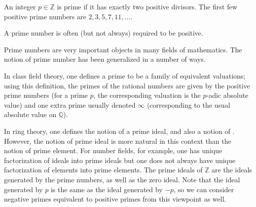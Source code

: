 \documentclass{article}
\begin{document}
An integer $p \in \mathbb{Z}$ is prime if it has exactly two positive divisors. The first few positive prime numbers are $2, 3, 5, 7, 11, \dots$.

A prime number is often (but not always) required to be positive.

Prime numbers are very important objects in many fields of mathematics.  The notion of prime number has been generalized in a number of ways.  

In class field theory, one defines a prime to be a family of equivalent valuations; using this definition, the primes of the rational numbers are given by the positive prime numbers (for a prime $p$, the corresponding valuation is the $p$-adic absolute value) and one extra prime usually denoted $\infty$ (corresponding to the usual absolute value on $\mathbb{Q}$). 

In ring theory, one defines the notion of a prime ideal, and also a notion of .  However, the notion of prime ideal is more natural in this context than the notion of prime element.  For number fields, for example, one has unique factorization of ideals into prime ideals but one does not always have unique factorization of elements into prime elements.  The prime ideals of $\mathbb{Z}$ are the ideals generated by the prime numbers, as well as the zero ideal.  Note that the ideal generated by $p$ is the same as the ideal generated by $-p$, so we can consider negative primes equivalent to positive primes from this viewpoint as well.
\end{document}
